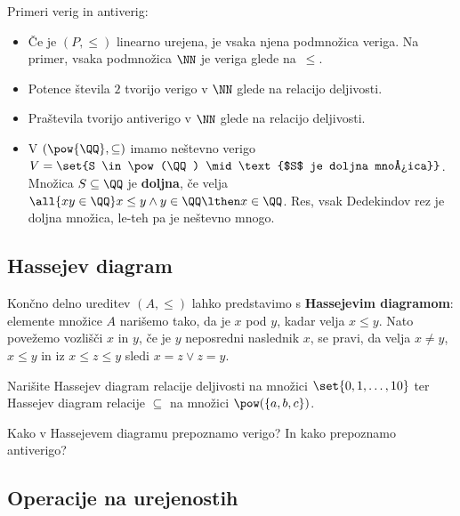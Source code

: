\begin{primer}
\end{primer}

\begin{primer}
  Primeri verig in antiverig:
  \begin{itemize}
  \item Če je $(P, {\leq})$ linearno urejena, je vsaka njena podmnožica veriga. Na primer, vsaka podmnožica $\NN$ je veriga glede na~$\leq$.
  \item Potence števila $2$ tvorijo verigo v $\NN$ glede na relacijo deljivosti.
  \item Praštevila tvorijo antiverigo v $\NN$ glede na relacijo deljivosti.
  \item V $(\pow{\QQ}, {\subseteq})$ imamo neštevno verigo
    $V = \set{S \in \pow(\QQ) \mid \text{$S$ je doljna množica}}$.
    Množica $S \subseteq \QQ$ je \textbf{doljna}, če velja
    $\all{x y \in \QQ} x \leq y \land y \in \QQ \lthen x \in \QQ$.
    Res, vsak Dedekindov rez je doljna množica, le-teh pa je neštevno mnogo.
  \end{itemize}
\end{primer}



\subsection{Hassejev diagram}

Končno delno ureditev $(A, \leq)$ lahko predstavimo s \textbf{Hassejevim diagramom}: elemente
množice $A$ narišemo tako, da je $x$ pod $y$, kadar velja $x \leq y$. Nato povežemo vozlišči $x$ in $y$, če je $y$ neposredni naslednik $x$, se pravi, da velja $x \neq y$, $x \leq y$ in iz $x \leq z \leq y$ sledi $x = z \lor z = y$.

\begin{naloga}
  Narišite Hassejev diagram relacije deljivosti na množici $\set{0, 1, \dots, 10}$ ter
  Hassejev diagram relacije $\subseteq$ na množici $\pow(\{a,b,c\})$.
\end{naloga}

\begin{naloga}
  Kako v Hassejevem diagramu prepoznamo verigo? In kako prepoznamo antiverigo?
\end{naloga}


\subsection{Operacije na urejenostih}

